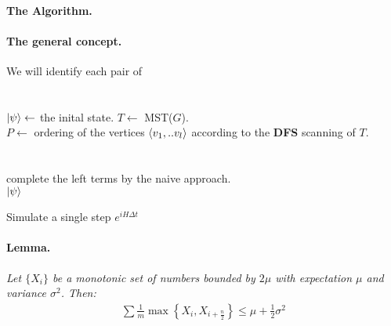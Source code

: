 \documentclass{article}
\begin{document}
\begin{multicols*}{2}
    \paragraph{The Algorithm.}

\paragraph{The general concept.} We will identify each pair of  


\paragraph{}

\begin{algorithm}[H]
\SetAlgoLined
\ \\ 
\( \ket{\psi} \leftarrow \) the inital state.
 \(T  \leftarrow\) MST(\(G\)). \\
 \(P \leftarrow \) ordering of the vertices \( \braket{v_{1} , .. v_{l}}\) according to the \textbf{DFS} scanning of \(T\). \\
 \ \\ 
 \ \\
 complete the left terms by the naive approach. \\
 \Return \( \ket{\psi} \)
 \caption{Simulate a single step \(e^{iH\Delta t}\)}
\end{algorithm}


\paragraph{Lemma.} \textit{Let \(\{X_{i}\}\) be a monotonic set of numbers bounded by \(2\mu\) with expectation \( \mu \) and variance \( \sigma^2 \). Then:}
\begin{equation*}
    \begin{split}
        \sum{ \frac{1}{m}\max{ \left\{ X_{i}, X_{i+ \frac{n}{2}} \right\} } } \le \mu + \frac{1}{2}\sigma^2  
    \end{split}
\end{equation*}

\end{multicols*}
\end{document}
